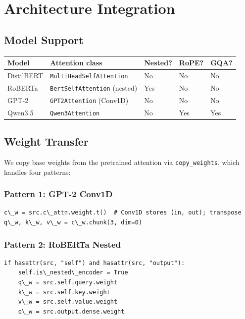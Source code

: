 \section{Architecture Integration}

\subsection{Model Support}

\begin{table}[H]
\centering
\small
\begin{tabular}{lllll}
\toprule
\textbf{Model} & \textbf{Attention class} & \textbf{Nested?} & \textbf{RoPE?} & \textbf{GQA?} \\
\midrule
DistilBERT & \texttt{MultiHeadSelfAttention} & No & No & No \\
RoBERTa & \texttt{BertSelfAttention} (nested) & Yes & No & No \\
GPT-2 & \texttt{GPT2Attention} (Conv1D) & No & No & No \\
Qwen3.5 & \texttt{Qwen3Attention} & No & Yes & Yes \\
\bottomrule
\end{tabular}
\end{table}

\subsection{Weight Transfer}

We copy base weights from the pretrained attention via \texttt{copy\_weights}, which 
handles four patterns:

\subsubsection{Pattern 1: GPT-2 Conv1D}

\begin{lstlisting}
c\_w = src.c\_attn.weight.t()  # Conv1D stores (in, out); transpose
q\_w, k\_w, v\_w = c\_w.chunk(3, dim=0)
\end{lstlisting}

\subsubsection{Pattern 2: RoBERTa Nested}

\begin{lstlisting}
if hasattr(src, "self") and hasattr(src, "output"):
    self.is\_nested\_encoder = True
    q\_w = src.self.query.weight
    k\_w = src.self.key.weight
    v\_w = src.self.value.weight
    o\_w = src.output.dense.weight
\end{lstlisting}

